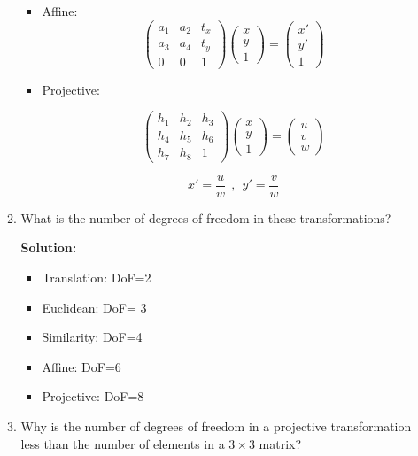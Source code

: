 \documentclass[12pt]{article}
\begin{document}
\begin{enumerate}[leftmargin=\labelsep]
\begin{enumerate}
\begin{itemize}
\item Affine:
\begin{equation}
     \begin{pmatrix}
a_1 & a_2 &  t_x \\
a_3 & a_4 & t_y \\
0 & 0 & 1
    \end{pmatrix}
    \begin{pmatrix}
        x \\
        y \\
        1 
        \end{pmatrix}
        =
        \begin{pmatrix}
        x' \\
        y' \\
        1 
        \end{pmatrix}
\end{equation}

\item Projective:

  \begin{equation}
  \begin{pmatrix}
h_1 & h_2 &  h_3 \\
h_4 & h_5 & h_6 \\
h_7 & h_8 & 1
\end{pmatrix}
\begin{pmatrix}
        x \\
        y \\
        1 
        \end{pmatrix}
        =
        \begin{pmatrix}
        u \\
        v \\
        w 
        \end{pmatrix}
\end{equation}

   \begin{equation}
   x'=\frac{u}{w}\ \  , \ \  y'=\frac{v}{w}
    \end{equation}
    \end{itemize}
\item  What is the number of degrees of freedom in these transformations?

\textbf{Solution:}
\begin{itemize}
    \item Translation: DoF=2
    \item Euclidean: DoF= 3
    \item Similarity: DoF=4
    \item Affine: DoF=6
    \item Projective: DoF=8
\end{itemize}
\item  Why is the number of degrees of freedom in a projective transformation less than the number of elements in a $3\times3$ matrix?


\end{enumerate}
\end{enumerate}
\end{document}
